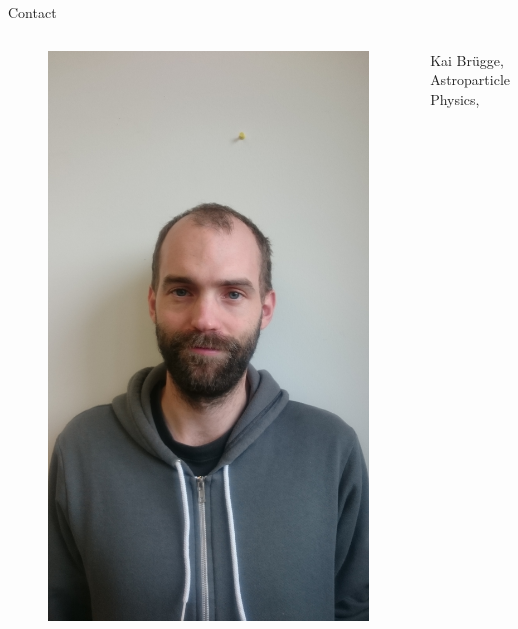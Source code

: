 \begin{columns}[t, onlytextwidth]
\begin{column}{0.30\textwidth}
\begin{block}[equal height group=bottom]{\normalsize Contact}
\begin{columns}[T]
\begin{column}{0.2\textwidth}
\begin{figure}
                \includegraphics[width=1.2\linewidth, angle=-90]{images/kai.jpg}
              \end{figure}
        \end{column}
        \begin{column}{0.3\textwidth}
            \footnotesize
                     \vspace*{0.5cm}
                Kai Brügge, \\
                Astroparticle Physics, \\

\end{column}
\end{columns}
\end{block}
\end{column}
\end{columns}
